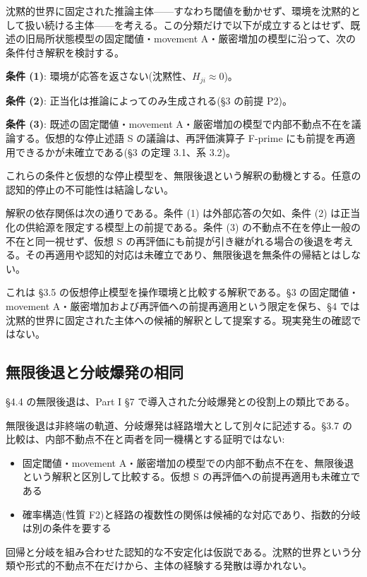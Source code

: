 沈黙的世界に固定された推論主体——すなわち閾値を動かせず、環境を沈黙的として扱い続ける主体——を考える。この分類だけで以下が成立するとはせず、既述の旧局所状態模型の固定閾値・movement A・厳密増加の模型に沿って、次の条件付き解釈を検討する。

\textbf{条件 (1)}: 環境が応答を返さない(沈黙性、$H_{ji} \approx 0$)。

\textbf{条件 (2)}: 正当化は推論によってのみ生成される(\S{}3 の前提 P2)。

\textbf{条件 (3)}: 既述の固定閾値・movement A・厳密増加の模型で内部不動点不在を議論する。仮想的な停止述語 S の議論は、再評価演算子 F-prime にも前提を再適用できるかが未確立である(\S{}3 の定理 3.1、系 3.2)。

これらの条件と仮想的な停止模型を、無限後退という解釈の動機とする。任意の認知的停止の不可能性は結論しない。

解釈の依存関係は次の通りである。条件 (1) は外部応答の欠如、条件 (2) は正当化の供給源を限定する模型上の前提である。条件 (3) の不動点不在を停止一般の不在と同一視せず、仮想 S の再評価にも前提が引き継がれる場合の後退を考える。その再適用や認知的対応は未確立であり、無限後退を無条件の帰結とはしない。

これは \S{}3.5 の仮想停止模型を操作環境と比較する解釈である。\S{}3 の固定閾値・movement A・厳密増加および再評価への前提再適用という限定を保ち、\S{}4 では沈黙的世界に固定された主体への候補的解釈として提案する。現実発生の確認ではない。

\bigskip


\subsection{無限後退と分岐爆発の相同}


\S{}4.4 の無限後退は、Part I \S{}7 で導入された分岐爆発との役割上の類比である。

無限後退は非終端の軌道、分岐爆発は経路増大として別々に記述する。\S{}3.7 の比較は、内部不動点不在と両者を同一機構とする証明ではない:

\begin{itemize}
\item 固定閾値・movement A・厳密増加の模型での内部不動点不在を、無限後退という解釈と区別して比較する。仮想 S の再評価への前提再適用も未確立である
\item 確率構造(性質 F2)と経路の複数性の関係は候補的な対応であり、指数的分岐は別の条件を要する
\end{itemize}


回帰と分岐を組み合わせた認知的な不安定化は仮説である。沈黙的世界という分類や形式的不動点不在だけから、主体の経験する発散は導かれない。

